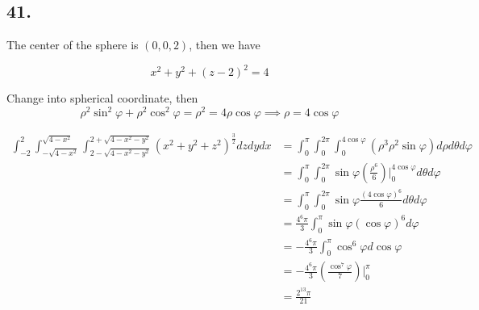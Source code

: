 \documentclass{article}
\begin{document}
  \subsection*{41. }

  The center of the sphere is $(0, 0, 2)$, then we have

  $$x^2 + y^2 + (z-2)^2 = 4$$

  Change into spherical coordinate, then $$\rho^2 \sin^2 \varphi + \rho^2 \cos^2 \varphi = \rho^2 = 4\rho \cos \varphi \implies \rho = 4\cos \varphi$$

  $$\begin{aligned}
    \int_{-2}^2 \int_{-\sqrt{4-x^2}}^{\sqrt{4-x^2}} \int_{2-\sqrt{4-x^2-y^2}}^{2 + \sqrt{4-x^2-y^2}} (x^2 + y^2 + z^2)^{\frac 3 2} dz dy dx &= \int_0^{\pi} \int_0^{2\pi} \int_0^{4\cos \varphi} (\rho^3 \rho^2 \sin \varphi) d\rho d\theta d\varphi \\
    &= \int_0^{\pi} \int_0^{2\pi} \sin \varphi (\frac{\rho^6}{6})\biggl|_0^{4\cos \varphi} d\theta d\varphi \\
    &= \int_0^{\pi} \int_0^{2\pi} \sin \varphi \frac{(4\cos \varphi)^6}{6} d\theta d\varphi \\
    &= \frac{4^6 \pi}{3} \int_0^{\pi} \sin \varphi (\cos \varphi)^6  d\varphi \\
    &= -\frac{4^6 \pi}{3} \int_0^{\pi} \cos^6 \varphi d\cos \varphi \\
    &=  -\frac{4^6 \pi}{3} (\frac{\cos^7 \varphi}{7})\biggl|_0^{\pi} \\
    &= \frac{2^{13}\pi}{21}
  \end{aligned}$$
\end{document}
